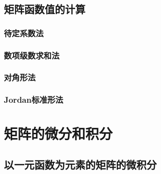 \begin{definition}[]
\end{definition}

\subsection{矩阵函数值的计算}
\label{sub:矩阵函数值的计算}

\subsubsection{待定系数法}
\label{ssub:待定系数法}

\subsubsection{数项级数求和法}
\label{ssub:数项级数求和法}

\subsubsection{对角形法}
\label{ssub:对角形法}

\subsubsection{Jordan标准形法}
\label{ssub:Jordan标准形法}

\begin{definition}[]
\end{definition}

\section{矩阵的微分和积分}
\label{sec:矩阵的微分和积分}

\subsection{以一元函数为元素的矩阵的微积分}
\label{sub:以一元函数为元素的矩阵的微积分}

\begin{definition}[]
\end{definition}

\begin{definition}[]
\end{definition}

\begin{definition}[]
\end{definition}

